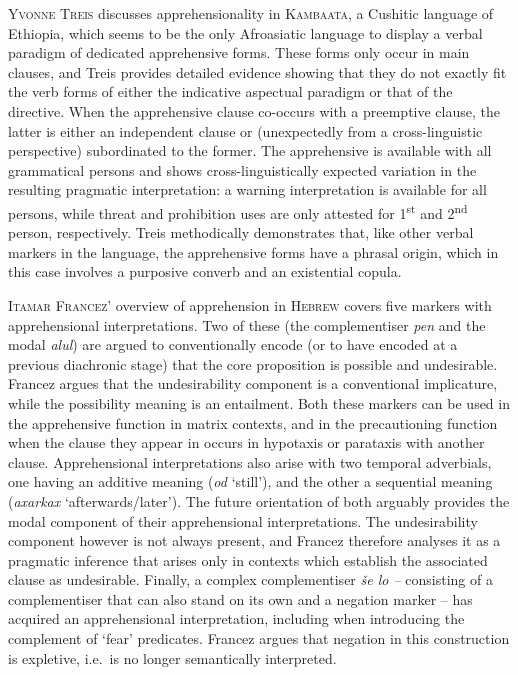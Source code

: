 \documentclass[output=paper,colorlinks,citecolor=brown
]{langscibook}
\begin{document}
\textsc{Yvonne} \textsc{Treis} discusses apprehensionality in \textsc{Kambaata}, a Cushitic language of Ethiopia, which seems to be the only Afroasiatic language to display a verbal paradigm of dedicated apprehensive forms. These forms only occur in main clauses, and Treis provides detailed evidence showing that they do not exactly fit the verb forms of either the indicative aspectual paradigm or that of the directive. When the apprehensive clause co-occurs with a preemptive clause, the latter is either an independent clause or (unexpectedly from a cross-linguistic perspective) subordinated to the former. The apprehensive is available with all grammatical persons and shows cross-linguistically expected variation in the resulting pragmatic interpretation: a warning interpretation is available for all persons, while threat and prohibition uses are only attested for 1\textsuperscript{st} and 2\textsuperscript{nd} person, respectively. Treis methodically demonstrates that, like other verbal markers in the language, the apprehensive forms have a phrasal origin, which in this case involves a purposive converb and an existential copula.



\textsc{Itamar} \textsc{Francez{}'} overview of apprehension in \textsc{Hebrew} covers five markers with apprehensional interpretations. Two of these (the complementiser \textit{pen} and the modal \textit{alul}) are argued to conventionally encode (or to have encoded at a previous diachronic stage) that the core proposition is possible and undesirable. Francez argues that the undesirability component is a conventional implicature, while the possibility meaning is an entailment. Both these markers can be used in the apprehensive function in matrix contexts, and in the precautioning function when the clause they appear in occurs in hypotaxis or parataxis with another clause. Apprehensional interpretations also arise with two temporal adverbials, one having an additive meaning (\textit{od} `still'), and the other a sequential meaning (\textit{axarkax} `afterwards/later'). The future orientation of both arguably provides the modal component of their apprehensional interpretations. The undesirability component however is not always present, and Francez therefore analyses it as a pragmatic inference that arises only in contexts which establish the associated clause as undesirable. Finally, a complex complementiser \textit{še lo –} consisting of a complementiser that can also stand on its own and a negation marker – has acquired an apprehensional interpretation, including when introducing the complement of `fear' predicates. Francez argues that negation in this construction is expletive, i.e.\ is no longer semantically interpreted.
\end{document}

